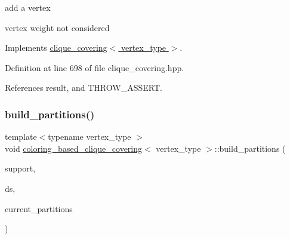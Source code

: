 add a vertex 

vertex weight not considered 

Implements \hyperlink{classclique__covering_a69a986de5537f3104ee2cea23a88c49d}{clique\+\_\+covering$<$ vertex\+\_\+type $>$}.



Definition at line 698 of file clique\+\_\+covering.\+hpp.



References result, and T\+H\+R\+O\+W\+\_\+\+A\+S\+S\+E\+RT.

\mbox{\label{classcoloring__based__clique__covering_a5834eb8fef3ff145870f5dbe25369060}} 
\subsubsection{\texorpdfstring{build\+\_\+partitions()}{build\_partitions()}}
{\footnotesize\ttfamily template$<$typename vertex\+\_\+type $>$ \\
void \hyperlink{classcoloring__based__clique__covering}{coloring\+\_\+based\+\_\+clique\+\_\+covering}$<$ vertex\+\_\+type $>$\+::build\+\_\+partitions (\begin{DoxyParamCaption}\item[{\hyperlink{classCustomUnorderedSet}{Custom\+Unordered\+Set}$<$ \hyperlink{clique__covering__graph_8hpp_a9cb45047ea8c5ed95a8cfa90494345aa}{C\+\_\+vertex} $>$ \&}]{support,  }\item[{boost\+::disjoint\+\_\+sets$<$ \hyperlink{clique__covering__graph_8hpp_af170aff46b9e4328f1ad9b119cf78b4a}{rank\+\_\+pmap\+\_\+type}, \hyperlink{clique__covering__graph_8hpp_af4c454ac367cfb12e29c98e6bc942a06}{pred\+\_\+pmap\+\_\+type} $>$ \&}]{ds,  }\item[{std\+::map$<$ \hyperlink{clique__covering__graph_8hpp_a9cb45047ea8c5ed95a8cfa90494345aa}{C\+\_\+vertex}, \hyperlink{classCustomOrderedSet}{Custom\+Ordered\+Set}$<$ \hyperlink{clique__covering__graph_8hpp_a9cb45047ea8c5ed95a8cfa90494345aa}{C\+\_\+vertex} $>$$>$ \&}]{current\+\_\+partitions }\end{DoxyParamCaption})\hspace{0.3cm}{\ttfamily [inline]}}



